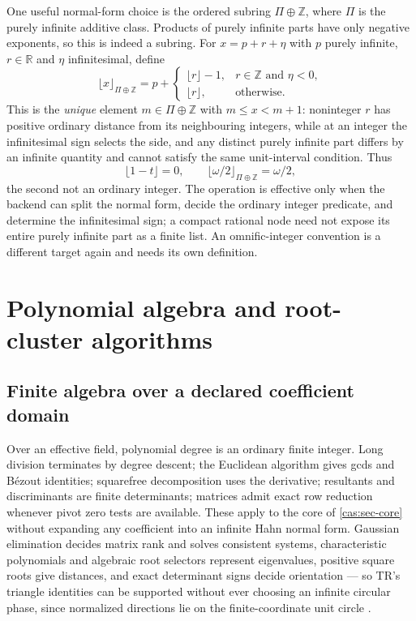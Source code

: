 \documentclass[11pt,letterpaper]{article}
\numberwithin{equation}{section}
\theoremstyle{definition}
\theoremstyle{remark}
\newcommand{\R}{\mathbb R}
\newcommand{\Z}{\mathbb Z}
\begin{document}
One useful normal-form choice is the ordered subring $\Pi\oplus\Z$, where $\Pi$
is the purely infinite additive class. Products of purely infinite parts have
only negative exponents, so this is indeed a subring. For $x=p+r+\eta$ with $p$
purely infinite, $r\in\R$ and $\eta$ infinitesimal, define
\begin{equation}\label{cas:eq-floor}
 \lfloor x\rfloor_{\Pi\oplus\Z}
 =p+\begin{cases}
 \lfloor r\rfloor-1,&r\in\Z\text{ and }\eta<0,\\
 \lfloor r\rfloor,&\text{otherwise.}
 \end{cases}
\end{equation}
This is the \emph{unique} element $m\in\Pi\oplus\Z$ with $m\le x<m+1$:
noninteger $r$ has positive ordinary distance from its neighbouring integers,
while at an integer the infinitesimal sign selects the side, and any distinct
purely infinite part differs by an infinite quantity and cannot satisfy the same
unit-interval condition. Thus
\[
 \lfloor1-t\rfloor=0,\qquad
 \lfloor\omega/2\rfloor_{\Pi\oplus\Z}=\omega/2 ,
\]
the second not an ordinary integer. The operation is effective only when the
backend can split the normal form, decide the ordinary integer predicate, and
determine the infinitesimal sign; a compact rational node need not expose its
entire purely infinite part as a finite list. An omnific-integer convention is a
different target again and needs its own definition.

\section{Polynomial algebra and root-cluster algorithms}
\label{cas:sec-polynomials}

\subsection{Finite algebra over a declared coefficient domain}
\label{cas:sub-finitealgebra}
Over an effective field, polynomial degree is an ordinary finite integer. Long
division terminates by degree descent; the Euclidean algorithm gives gcds and
B\'ezout identities; squarefree decomposition uses the derivative; resultants
and discriminants are finite determinants; matrices admit exact row reduction
whenever pivot zero tests are available. These apply to the core of
\cref{cas:sec-core} without expanding any coefficient into an infinite Hahn
normal form. Gaussian elimination decides matrix rank and solves consistent
systems, characteristic polynomials and algebraic root selectors represent
eigenvalues, positive square roots give distances, and exact determinant signs
decide orientation --- so TR's triangle identities can be supported without ever
choosing an infinite circular phase, since normalized directions lie on the
finite-coordinate unit circle \cite{cas:SourceTrig}.
\end{document}
